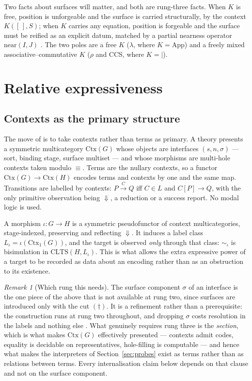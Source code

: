 \documentclass[11pt,a4paper]{article}
\theoremstyle{definition}
\theoremstyle{plain}
\theoremstyle{remark}
\newtheorem{remark}[definition]{Remark}
\newcommand{\CtxC}{\mathrm{Ctx}}
\newcommand{\rhoc}{\rho}
\newcommand{\near}{\mathrm{near}}
\begin{document}
Two facts about surfaces will matter, and both are rung-three facts. When $K$ is free, position is
unforgeable and the surface is carried structurally, by the context $K([\,],S)$; when $K$ carries any
equation, position is forgeable and the surface must be reified as an explicit datum, matched by a
partial nearness operator $\near(I,J)$ \cite[Rmk.~2.7]{probe}. The two poles are a free $K$ ($\lambda$, where
$K = \mathrm{App}$) and a freely mixed associative--commutative $K$ ($\rhoc$ and CCS, where
$K = {\mid}$).

\section{Relative expressiveness}
\label{sec:relative}

\subsection{Contexts as the primary structure}

The move of \cite{probe} is to take contexts rather than terms as primary. A theory presents a
symmetric multicategory $\CtxC(G)$ whose objects are interfaces $(s,n,\sigma)$ --- sort, binding
stage, surface multiset --- and whose morphisms are multi-hole contexts taken modulo $\equiv$.
Terms are the nullary contexts, so a functor $\CtxC(G) \to \CtxC(H)$ encodes terms and contexts by
one and the same map. Transitions are labelled by contexts:
$P \xrightarrow{\;C\;} Q$ iff $C \in L$ and $C[P] \to Q$, with the only primitive observation being
$\Downarrow$, a reduction or a success report. No modal logic is used.

A morphism $\iota : G \to H$ is a symmetric pseudofunctor of context multicategories, stage-indexed,
preserving and reflecting $\Downarrow$. It induces a label class $L_\iota = \iota(\CtxC_1(G))$, and
the target is observed \emph{only} through that class: $\sim_\iota$ is bisimulation in
$\mathrm{CLTS}(H, L_\iota)$. This is what allows the extra expressive power of a target to be
recorded as data about an encoding rather than as an obstruction to its existence.

\begin{remark}[Which rung this needs]
\label{rmk:which-rung}
The surface component $\sigma$ of an interface is the one piece of the above that is not available
at rung two, since surfaces are introduced only with the cut $(\dagger)$. It is a refinement rather
than a prerequisite: the construction runs at rung two throughout, and dropping $\sigma$ costs
resolution in the labels and nothing else \cite[Rmk.~2.8]{probe}. What genuinely requires rung three
is the \emph{section}, which is what makes $\CtxC(G)$ effectively presented --- contexts admit codes,
equality is decidable on representatives, hole-filling is computable \cite[Prop.~2.9]{probe} --- and
hence what makes the interpreters of Section~\ref{sec:probes} exist as terms rather than as relations
between terms. Every internalisation claim below depends on that clause and not on the surface
component.
\end{remark}
\end{document}
